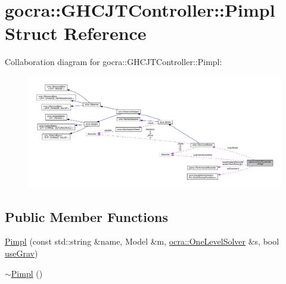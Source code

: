 \hypertarget{structgocra_1_1GHCJTController_1_1Pimpl}{}\section{gocra\+:\+:G\+H\+C\+J\+T\+Controller\+:\+:Pimpl Struct Reference}
\label{structgocra_1_1GHCJTController_1_1Pimpl}


Collaboration diagram for gocra\+:\+:G\+H\+C\+J\+T\+Controller\+:\+:Pimpl\+:\nopagebreak
\begin{figure}[H]
\begin{center}
\leavevmode
\includegraphics[width=350pt]{dd/d76/structgocra_1_1GHCJTController_1_1Pimpl__coll__graph}
\end{center}
\end{figure}
\subsection*{Public Member Functions}
\begin{DoxyCompactItemize}
\item 
\hyperlink{structgocra_1_1GHCJTController_1_1Pimpl_ad9ff86db7b59559d42a4d87eee73c761}{Pimpl} (const std\+::string \&name, Model \&m, \hyperlink{classocra_1_1OneLevelSolver}{ocra\+::\+One\+Level\+Solver} \&s, bool \hyperlink{structgocra_1_1GHCJTController_1_1Pimpl_a0a9b1d16fc029929004e00dbf358063a}{use\+Grav})
\item 
\hyperlink{structgocra_1_1GHCJTController_1_1Pimpl_a0df04a7ffd9f5bc6346fc786d1c30ef1}{$\sim$\+Pimpl} ()
\end{DoxyCompactItemize}

